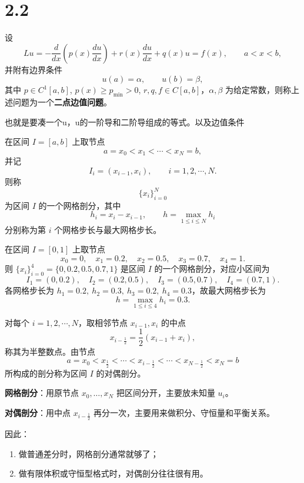 \section{2.2}
\begin{definition}[二点边值问题]
设
\[
Lu=-\frac{d}{dx}\!\left(p(x)\frac{du}{dx}\right)+r(x)\frac{du}{dx}+q(x)u=f(x),\qquad a<x<b,
\]
并附有边界条件
\[
u(a)=\alpha,\qquad u(b)=\beta,
\]
其中 \(p\in C^1[a,b]\), \(p(x)\ge p_{\min}>0\), \(r,q,f\in C[a,b]\)，\(\alpha,\beta\) 为给定常数，则称上述问题为一个\textbf{二点边值问题}。
\end{definition}
\begin{dxtips}
    也就是要凑一个u，u的一阶导和二阶导组成的等式。以及边值条件
\end{dxtips}
\begin{definition}[网格剖分]
在区间 \(I=[a,b]\) 上取节点
\[
a=x_0<x_1<\cdots<x_N=b,
\]
并记
\[
I_i=(x_{i-1},x_i),\qquad i=1,2,\cdots,N.
\]
则称
\[
\{x_i\}_{i=0}^N
\]
为区间 \(I\) 的一个网格剖分，其中
\[
h_i=x_i-x_{i-1},\qquad h=\max_{1\le i\le N}h_i
\]
分别称为第 \(i\) 个网格步长与最大网格步长。
\end{definition}
\begin{example}
在区间 \(I=[0,1]\) 上取节点
\[
x_0=0,\quad x_1=0.2,\quad x_2=0.5,\quad x_3=0.7,\quad x_4=1.
\]
则 \(\{x_i\}_{i=0}^4=\{0,0.2,0.5,0.7,1\}\) 是区间 \(I\) 的一个网格剖分，对应小区间为
\[
I_1=(0,0.2),\quad I_2=(0.2,0.5),\quad I_3=(0.5,0.7),\quad I_4=(0.7,1).
\]
各网格步长为 \(h_1=0.2,\ h_2=0.3,\ h_3=0.2,\ h_4=0.3\)，故最大网格步长为
\[
h=\max_{1\le i\le 4}h_i=0.3.
\]
\end{example}
\begin{definition}[对偶剖分]
对每个 \(i=1,2,\cdots,N\)，取相邻节点 \(x_{i-1},x_i\) 的中点
\[
x_{i-\frac12}=\frac12(x_{i-1}+x_i),
\]
称其为半整数点。由节点
\[
a=x_0<x_{\frac12}<\cdots<x_{i-\frac12}<\cdots<x_{N-\frac12}<x_N=b
\]
所构成的剖分称为区间 \(I\) 的对偶剖分。
\end{definition}
\begin{note}
\textbf{网格剖分}：用原节点 \(x_0,\dots,x_N\) 把区间分开，主要放未知量 \(u_i\)。

\textbf{对偶剖分}：用中点 \(x_{i-\frac12}\) 再分一次，主要用来做积分、守恒量和平衡关系。

因此：
\begin{enumerate}
    \item 做普通差分时，网格剖分通常就够了；
    \item 做有限体积或守恒型格式时，对偶剖分往往很有用。
\end{enumerate}
\end{note}
